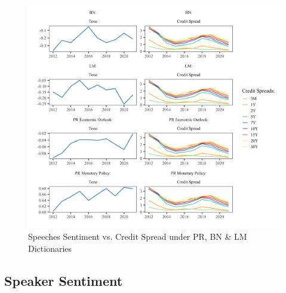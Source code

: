 \begin{figure}[H]
    \includegraphics[width = \textwidth]{figures/tonesspreads.png}
    \vspace{-9mm}
    \caption{Speeches Sentiment vs. Credit Spread under PR, BN \& LM Dictionaries}
    \label{fig:senticredit}  
\end{figure}


\subsection{Speaker Sentiment}




